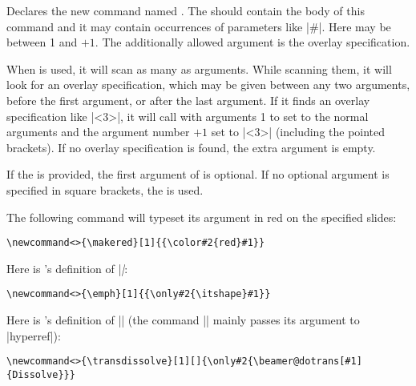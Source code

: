 \begin{command}{\newcommand\declare{|<>|}}
  Declares the new command named . The  should contain the body of this command and it may contain occurrences of parameters like |#|. Here  may be between 1 and  $+1$. The additionally allowed argument is the overlay specification.

  When  is used, it will scan as many as  arguments. While scanning them, it will look for an overlay specification, which may be given between any two arguments, before the first argument, or after the last argument. If it finds an overlay specification like |<3>|, it will call  with arguments 1 to  set to the normal arguments and the argument number  $+1$ set to |<3>| (including the pointed brackets). If no overlay specification is found, the extra argument is empty.

  If the  is provided, the first argument of  is optional. If no optional argument is specified in square brackets, the  is used.

  \example
  The following command will typeset its argument in red on the specified slides:
\begin{verbatim}
\newcommand<>{\makered}[1]{{\color#2{red}#1}}
\end{verbatim}

  \example
  Here is \beamer's definition of |\emph|:
\begin{verbatim}
\newcommand<>{\emph}[1]{{\only#2{\itshape}#1}}
\end{verbatim}

  \example
  Here is \beamer's definition of |\transdissolve| (the command |\beamer@dotrans| mainly passes its argument to |hyperref|):
\begin{verbatim}
\newcommand<>{\transdissolve}[1][]{\only#2{\beamer@dotrans[#1]{Dissolve}}}
\end{verbatim}
\end{command}


